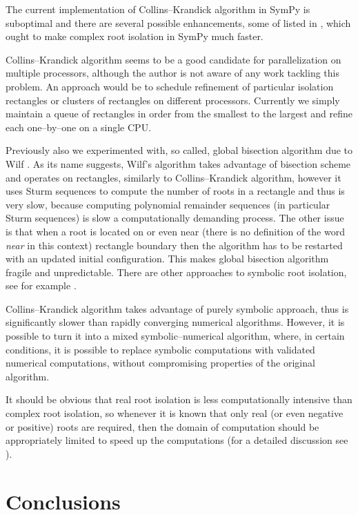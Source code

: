 The current implementation of Collins--Krandick algorithm in SymPy is suboptimal and there
are several possible enhancements, some of listed in \cite{Collins1992infallible}, which ought
to make complex root isolation in SymPy much faster.

Collins--Krandick algorithm seems to be a good candidate for parallelization on multiple
processors, although the author is not aware of any work tackling this problem. An approach
would be to schedule refinement of particular isolation rectangles or clusters of rectangles
on different processors. Currently we simply maintain a queue of rectangles in order from
the smallest to the largest and refine each one--by--one on a single CPU.

Previously also we experimented with, so called, global bisection algorithm due to Wilf
\cite{Wilf1978bisection}. As its name suggests, Wilf's algorithm takes advantage of bisection
scheme and operates on rectangles, similarly to Collins--Krandick algorithm, however it uses
Sturm sequences to compute the number of roots in a rectangle and thus is very slow, because
computing polynomial remainder sequences (in particular Sturm sequences) is slow a computationally
demanding process. The other issue is that when a root is located on or even near (there is no
definition of the word \emph{near} in this context) rectangle boundary then the algorithm has to be
restarted with an updated initial configuration. This makes global bisection algorithm fragile
and unpredictable. There are other approaches to symbolic root isolation, see for example
\cite{Pinkert1976complex}.

Collins--Krandick algorithm takes advantage of purely symbolic approach, thus is significantly
slower than rapidly converging numerical algorithms. However, it is possible to turn it into a
mixed symbolic--numerical algorithm, where, in certain conditions, it is possible to replace
symbolic computations with validated numerical computations, without compromising properties
of the original algorithm.

It should be obvious that real root isolation is less computationally intensive than complex
root isolation, so whenever it is known that only real (or even negative or positive) roots
are required, then the domain of computation should be appropriately limited to speed up the
computations (for a detailed discussion see \cite{Collins1996complex}).


\section{Conclusions}

